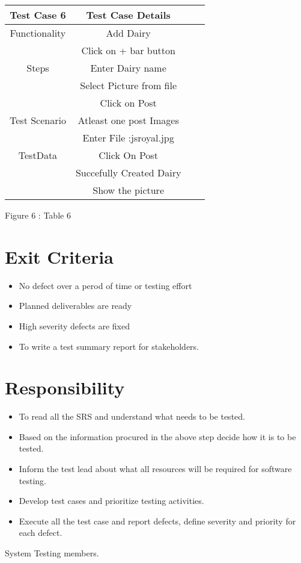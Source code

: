 \documentclass[]{article}
\begin{document}
\begin{center}
\begin{tabular}{ |c|c|c|c| }
\hline
Test Case 6 & Test Case Details  \hspace{4cm}  \\ 
\hline
 Functionality & Add Dairy  \\ 
\hline
\multirow{3}{4em}{Steps} & Click on + bar button   \\ 
& Enter Dairy name  \\
& Select Picture from file  \\
& Click on Post  \\ 
\hline
Test Scenario & Atleast one post Images  \\
\hline
\multirow{3}{4em}{TestData} & Enter File :jsroyal.jpg\\ 
& Click On Post \\ 
\hline
\multirow{3}{4em}{DesireResult} & Succefully Created Dairy  \\ 
& Show the picture\\ 
 
\hline
\end{tabular}
\end{center}
\hspace{3.5cm} Figure 6 : Table 6




\section{Exit Criteria}
\begin{itemize}
\item No defect over a perod of time or testing effort
\item Planned deliverables are ready
\item High severity defects are fixed
\item To write a test summary report for stakeholders.
\end{itemize}

\section{Responsibility}
\begin{itemize}
\item To read all the SRS and understand what needs to be tested.
\item Based on the information procured in the above step decide how it is to be tested.
\item Inform the test lead about what all resources will be required for software testing.
\item Develop test cases and prioritize testing activities.
\item Execute all the test case and report defects, define severity and priority for each defect.

\end{itemize}


  System Testing members.
\end{document}

